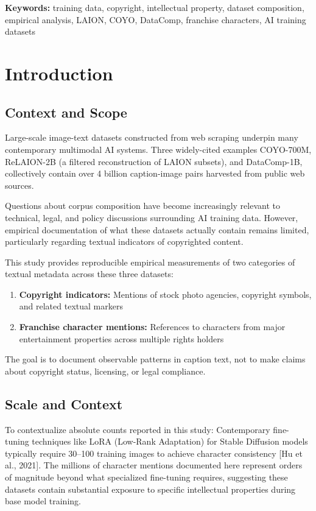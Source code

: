 \documentclass[11pt]{article}
\begin{document}
\noindent\textbf{Keywords:} training data, copyright, intellectual property, dataset composition, empirical analysis, LAION, COYO, DataComp, franchise characters, AI training datasets

\clearpage 

\section{Introduction}

\subsection{Context and Scope}
Large-scale image-text datasets constructed from web scraping underpin many contemporary multimodal AI systems. Three widely-cited examples COYO-700M, ReLAION-2B (a filtered reconstruction of LAION subsets), and DataComp-1B, collectively contain over 4 billion caption-image pairs harvested from public web sources.

Questions about corpus composition have become increasingly relevant to technical, legal, and policy discussions surrounding AI training data. However, empirical documentation of what these datasets actually contain remains limited, particularly regarding textual indicators of copyrighted content.

This study provides reproducible empirical measurements of two categories of textual metadata across these three datasets:

\begin{enumerate} \item \textbf{Copyright indicators:} Mentions of stock photo agencies, copyright symbols, and related textual markers 
\item  \textbf{Franchise character mentions:} References to characters from major entertainment properties across multiple rights holders \end{enumerate}

The goal is to document observable patterns in caption text, not to make claims about copyright status, licensing, or legal compliance.



\subsection{Scale and Context}
To contextualize absolute counts reported in this study: Contemporary fine-tuning techniques like LoRA (Low-Rank Adaptation) for Stable Diffusion models typically require 30–100 training images to achieve character consistency [Hu et al., 2021]. The millions of character mentions documented here represent orders of magnitude beyond what specialized fine-tuning requires, suggesting these datasets contain substantial exposure to specific intellectual properties during base model training.
\end{document}
